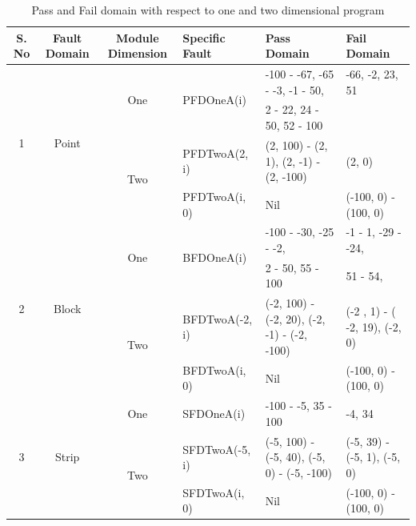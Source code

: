 \documentclass{acm_proc_article-sp}
\begin{document}
\begin{table}[t]
\centering
\small 

\begin{tabular}{|c|c|c|l|l|l|}

\hline 


S. No		& Fault Domain	 				& Module Dimension 		& Specific Fault	 		& Pass Domain 					& Fail Domain 			\\ \hline 

\multirow{4}{*}{1} 	&	\multirow{4}{*}{Point}		& 	\multirow{2}{*}{One}			&	\multirow{2}{*}{PFDOneA(i)}	&	-100 - -67, -65 - -3, -1 - 50,  			& -66, -2, 23, 51			 	\\  
				&									&							&							&	2 - 22, 24 - 50, 52 - 100				&							\\  \cline{3-6}
				&									&	\multirow{2}{*}{Two}			&	PFDTwoA(2, i)				&	(2, 100) - (2, 1),	 (2, -1) - (2, -100)		&  (2, 0)						\\  \cline{4-6}
				&									& 							&	PFDTwoA(i, 0)				&	Nil								& (-100, 0) - (100, 0)				\\  \hline



\multirow{4}{*}{2} 	&	\multirow{4}{*}{Block}		& 	\multirow{2}{*}{One}			&	\multirow{2}{*}{BFDOneA(i)}	&	-100 - -30, -25 - -2, 					& 	-1 - 1, -29 - -24,		 	\\ 
				&									&							&							&	2 - 50, 55 - 100						&	51 - 54,				\\  \cline{3-6}
				&									&	\multirow{2}{*}{Two}			&	BFDTwoA(-2, i)				&	(-2, 100) - (-2, 20), (-2, -1) - (-2, -100)	& 	(-2 , 1) - ( -2, 19), (-2, 0)		\\  \cline{4-6}
				&									& 							&	BFDTwoA(i, 0)				&	Nil								& 	(-100, 0) - (100, 0)		\\  \hline
				
				



\multirow{4}{*}{3} 	&	\multirow{4}{*}{Strip}		& 	\multirow{2}{*}{One}			&	\multirow{2}{*}{SFDOneA(i)}	&	\multirow{2}{*}{-100 - -5, 35 - 100}		& 	\multirow{2}{*}{-4, 34	}\\ 
				&									&							&							&									&				\\  \cline{3-6}
				&									&	\multirow{2}{*}{Two}			&	SFDTwoA(-5, i)				&	(-5, 100) - (-5, 40), (-5, 0) - (-5, -100)		&  (-5, 39) - (-5, 1), (-5, 0)			\\  \cline{4-6}
				&									& 							&	SFDTwoA(i, 0)				&	Nil								&  (-100, 0) - (100, 0)			\\  \hline
				
				
\end{tabular}
\bigskip
\caption{Pass and Fail domain with respect to one and two dimensional program}
\label{tab:failtable}
\end{table}
\end{document}
